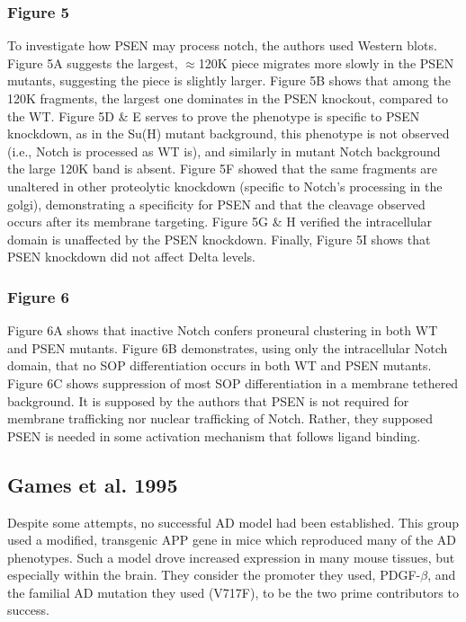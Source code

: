 \documentclass[12pt]{report}
\newcommand{\be}{\beta}
\begin{document}
\subsubsection*{Figure 5}
To investigate how PSEN may process notch, the authors used Western blots. Figure 5A suggests the largest, $\approx$120K piece migrates more slowly in the PSEN mutants, suggesting the piece is slightly larger. Figure 5B shows that among the 120K fragments, the largest one dominates in the PSEN knockout, compared to the WT. Figure 5D \& E serves to prove the phenotype is specific to PSEN knockdown, as in the Su(H) mutant background, this phenotype is not observed (i.e., Notch is processed as WT is), and similarly in mutant Notch background the large 120K band is absent. Figure 5F showed that the same fragments are unaltered in other proteolytic knockdown (specific to Notch's processing in the golgi), demonstrating a specificity for PSEN and that the cleavage observed occurs after its membrane targeting. Figure 5G \& H verified the intracellular domain is unaffected by the PSEN knockdown. Finally, Figure 5I shows that PSEN knockdown did not affect Delta levels. 

\subsubsection*{Figure 6}
Figure 6A shows that inactive Notch confers proneural clustering in both WT and PSEN mutants. Figure 6B demonstrates, using only the intracellular Notch domain, that no SOP differentiation occurs in both WT and PSEN mutants. Figure 6C shows suppression of most SOP differentiation in a membrane tethered background. It is supposed by the authors that PSEN is not required for membrane trafficking nor nuclear trafficking of Notch. Rather, they supposed PSEN is needed in some activation mechanism that follows ligand binding.  

\subsection*{Games et al. 1995}

Despite some attempts, no successful AD model had been established. This group used a modified, transgenic APP gene in mice which reproduced many of the AD phenotypes. Such a model drove increased expression in many mouse tissues, but especially within the brain. They consider the promoter they used, PDGF-$\be$, and the familial AD mutation they used (V717F), to be the two prime contributors to success. 
\end{document}
